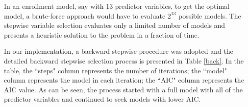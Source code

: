 \documentclass[12pt,english]{report}
\begin{document}
In an enrollment model, say with 13 predictor variables, to get the optimal
model, a brute-force approach would have to evaluate $2^{13}$ possible models.
The stepwise variable selection evaluates only a limited number of models and
presents a heuristic solution to the problem in a fraction of time.

In our implementation, a backward stepwise procedure was adopted and the
detailed backward stepwise selection process is presented in Table \ref{back}.
In the table, the ``steps" column represents the number of iterations; the
``model" column represents the model in each iteration; the ``AIC" column
represents the AIC value.  As can be seen, the process started with a full
model with all of the predictor variables and continued to seek models with
lower AIC.

\begin{table}
\end{table}
\end{document}
